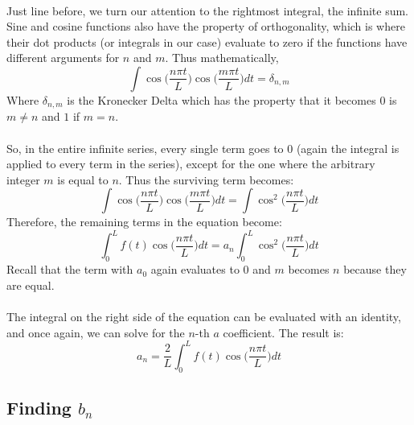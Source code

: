 \documentclass[12pt,letterpaper]{article}
\begin{document}
\paragraph*{}Just line before, we turn our attention to the rightmost integral, the infinite sum. Sine and cosine functions also have the property of orthogonality, which is where their dot products (or integrals in our case) evaluate to zero if the functions have different arguments for $n$ and $m$. Thus mathematically,
\begin{equation}
\label{orthog1}
\int \cos\Big(\frac{n\pi t}{L}\Big)\cos\Big(\frac{m\pi t}{L}\Big) dt = \delta_{n,m}
\end{equation}
Where $\delta_{n,m}$ is the Kronecker Delta which has the property that it becomes $0$ is $m \neq n$ and $1$ if $m = n$.
\paragraph*{}So, in the entire infinite series, every single term goes to $0$ (again the integral is applied to every term in the series), except for the one where the arbitrary integer $m$ is equal to $n$. Thus the surviving term becomes:
\begin{equation}
\int \cos\Big(\frac{n\pi t}{L}\Big)\cos\Big(\frac{m\pi t}{L}\Big) dt =
\int \cos^2\Big(\frac{n\pi t}{L}\Big) dt
\end{equation}
Therefore, the remaining terms in the equation become:
\begin{equation}
\int_0^L f(t)\cos\Big(\frac{n\pi t}{L}\Big) dt = 
a_n \int_0^L \cos^2\Big(\frac{n\pi t}{L}\Big) dt
\end{equation}
Recall that the term with $a_0$ again evaluates to $0$ and $m$ becomes $n$ because they are equal.
\paragraph*{}The integral on the right side of the equation can be evaluated with an identity, and once again, we can solve for the $n$-th $a$ coefficient. The result is:
\begin{equation}
\label{a_n}
a_n = \frac{2}{L}\int_0^L f(t)\cos\Big(\frac{n\pi t}{L}\Big) dt
\end{equation}


\subsection{Finding $b_n$}
\end{document}
